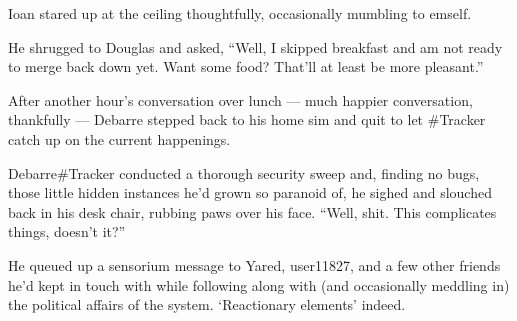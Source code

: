 Ioan stared up at the ceiling thoughtfully, occasionally mumbling to emself.

He shrugged to Douglas and asked, ``Well, I skipped breakfast and am not ready to merge back down yet. Want some food? That'll at least be more pleasant.''

After another hour's conversation over lunch — much happier conversation, thankfully — Debarre stepped back to his home sim and quit to let \#Tracker catch up on the current happenings.

Debarre\#Tracker conducted a thorough security sweep and, finding no bugs, those little hidden instances he'd grown so paranoid of, he sighed and slouched back in his desk chair, rubbing paws over his face. ``Well, shit. This complicates things, doesn't it?''

He queued up a sensorium message to Yared, user11827, and a few other friends he'd kept in touch with while following along with (and occasionally meddling in) the political affairs of the system. `Reactionary elements' indeed.
